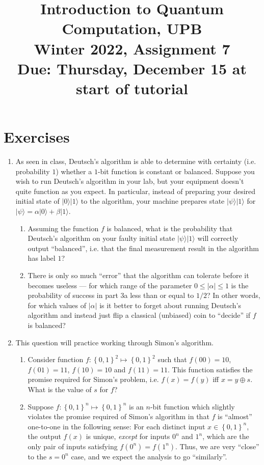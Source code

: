 \documentclass{article}
\newcommand{\ket}[1]{|#1\rangle}
\newcommand{\set}[1]{{\left\{#1\right\}}}    %
\newcommand{\abs}[1]{\left\lvert #1 \right\rvert}
\begin{document}
\title{\vspace{-10mm}Introduction to Quantum Computation, UPB\\Winter 2022, Assignment 7\\{\large Due: Thursday, December 15 at start of tutorial}}
\date{}
\maketitle


\section*{Exercises}
\begin{enumerate}
\item As seen in class, Deutsch's algorithm is able to determine with certainty (i.e. probability $1$) whether a $1$-bit function is constant or balanced. Suppose you wish to run Deutsch's algorithm in your lab, but your equipment doesn't quite function as you expect. In particular, instead of preparing your desired initial state of $\ket{0}\ket{1}$ to the algorithm, your machine prepares state $\ket{\psi}\ket{1}$ for $\ket{\psi}=\alpha\ket{0}+\beta\ket{1}$.
        \begin{enumerate}
            \item Assuming the function $f$ is balanced, what is the probability that Deutsch's algorithm on your faulty initial state $\ket{\psi}\ket{1}$ will correctly output ``balanced'', i.e. that the final measurement result in the algorithm has label $1$?
            \item There is only so much ``error'' that the algorithm can tolerate before it becomes useless --- for which range of the parameter $0\leq\abs{\alpha}\leq 1$ is the probability of success in part 3a less than or equal to $1/2$? In other words, for which values of $\abs{\alpha}$ is it better to forget about running Deutsch's algorithm and instead just flip a classical (unbiased) coin to ``decide'' if $f$ is balanced?
        \end{enumerate}
    \item This question will practice working through Simon's algorithm.
     \begin{enumerate}
        \item Consider function $f:\set{0,1}^2\mapsto\set{0,1}^2$ such that $f(00)=10$, $f(01)=11$, $f(10)=10$ and $f(11)=11$. This function satisfies the promise required for Simon's problem, i.e. $f(x)=f(y)$ iff $x=y\oplus s$. What is the value of $s$ for $f$?
        \item Suppose $f:\set{0,1}^n\mapsto \set{0,1}^n$ is an $n$-bit function which slightly violates the promise required of Simon's algorithm in that $f$ is ``almost'' one-to-one in the following sense: For each distinct input $x\in\set{0,1}^n$, the output $f(x)$ is unique, \emph{except} for inputs $0^n$ and $1^n$, which are the only pair of inputs satisfying $f(0^n)=f(1^n)$. Thus, we are very ``close'' to the $s=0^n$ case, and we expect the analysis to go ``similarly''.


\end{enumerate}
\end{enumerate}
\end{document}

